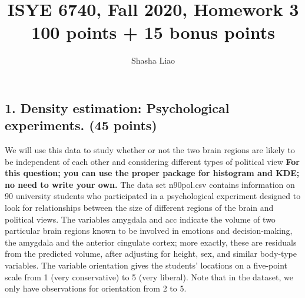 \documentclass[twoside,12pt]{article}
\begin{document}
\title{ISYE 6740, Fall 2020, Homework 3\\{\small 100 points + 15 bonus points}}
\author{Shasha Liao}
\date{}
\maketitle

\subsection*{1. Density estimation: Psychological experiments. (45 points)}

We will use this data to study whether or not the two brain regions are likely to be independent of each other and considering different types of political view \textbf{For this question; you can use the proper package for histogram and KDE; no need to write your own.} The data set \textsf{n90pol.csv} contains information on 90 university students who participated in a psychological experiment designed to look for relationships between the size of different regions of the brain and political views. The variables \textsf{amygdala} and \textsf{acc} indicate the volume of two particular brain regions known to be involved in emotions and decision-making, the amygdala and the anterior cingulate cortex; more exactly, these are residuals from the predicted volume, after adjusting for height, sex, and similar body-type variables. The variable \textsf{orientation} gives the students' locations on a five-point scale from 1 (very conservative) to 5 (very liberal).  Note that in the dataset, we only have observations for orientation from 2 to 5. 
  
\end{document}
